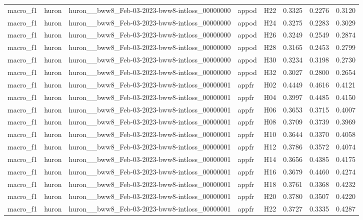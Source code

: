 \begin{table}[tbp]
\begin{tabular}{lllllrrr}
macro\_f1 & huron & huron\_\_bww8\_Feb-03-2023-bww8-intloss\_00000000 & appod & H22 & 0.3325 & 0.2276 & 0.3120 \\
macro\_f1 & huron & huron\_\_bww8\_Feb-03-2023-bww8-intloss\_00000000 & appod & H24 & 0.3275 & 0.2283 & 0.3029 \\
macro\_f1 & huron & huron\_\_bww8\_Feb-03-2023-bww8-intloss\_00000000 & appod & H26 & 0.3249 & 0.2549 & 0.2874 \\
macro\_f1 & huron & huron\_\_bww8\_Feb-03-2023-bww8-intloss\_00000000 & appod & H28 & 0.3165 & 0.2453 & 0.2799 \\
macro\_f1 & huron & huron\_\_bww8\_Feb-03-2023-bww8-intloss\_00000000 & appod & H30 & 0.3234 & 0.3198 & 0.2730 \\
macro\_f1 & huron & huron\_\_bww8\_Feb-03-2023-bww8-intloss\_00000000 & appod & H32 & 0.3027 & 0.2800 & 0.2654 \\
macro\_f1 & huron & huron\_\_bww8\_Feb-03-2023-bww8-intloss\_00000001 & appfr & H02 & 0.4449 & 0.4616 & 0.4121 \\
macro\_f1 & huron & huron\_\_bww8\_Feb-03-2023-bww8-intloss\_00000001 & appfr & H04 & 0.3997 & 0.4485 & 0.4150 \\
macro\_f1 & huron & huron\_\_bww8\_Feb-03-2023-bww8-intloss\_00000001 & appfr & H06 & 0.3653 & 0.3715 & 0.4007 \\
macro\_f1 & huron & huron\_\_bww8\_Feb-03-2023-bww8-intloss\_00000001 & appfr & H08 & 0.3709 & 0.3739 & 0.3969 \\
macro\_f1 & huron & huron\_\_bww8\_Feb-03-2023-bww8-intloss\_00000001 & appfr & H10 & 0.3644 & 0.3370 & 0.4058 \\
macro\_f1 & huron & huron\_\_bww8\_Feb-03-2023-bww8-intloss\_00000001 & appfr & H12 & 0.3786 & 0.3572 & 0.4074 \\
macro\_f1 & huron & huron\_\_bww8\_Feb-03-2023-bww8-intloss\_00000001 & appfr & H14 & 0.3656 & 0.4385 & 0.4175 \\
macro\_f1 & huron & huron\_\_bww8\_Feb-03-2023-bww8-intloss\_00000001 & appfr & H16 & 0.3679 & 0.4460 & 0.4274 \\
macro\_f1 & huron & huron\_\_bww8\_Feb-03-2023-bww8-intloss\_00000001 & appfr & H18 & 0.3761 & 0.3368 & 0.4232 \\
macro\_f1 & huron & huron\_\_bww8\_Feb-03-2023-bww8-intloss\_00000001 & appfr & H20 & 0.3780 & 0.3507 & 0.4220 \\
macro\_f1 & huron & huron\_\_bww8\_Feb-03-2023-bww8-intloss\_00000001 & appfr & H22 & 0.3727 & 0.3335 & 0.4287 \\

\end{tabular}
\end{table}
